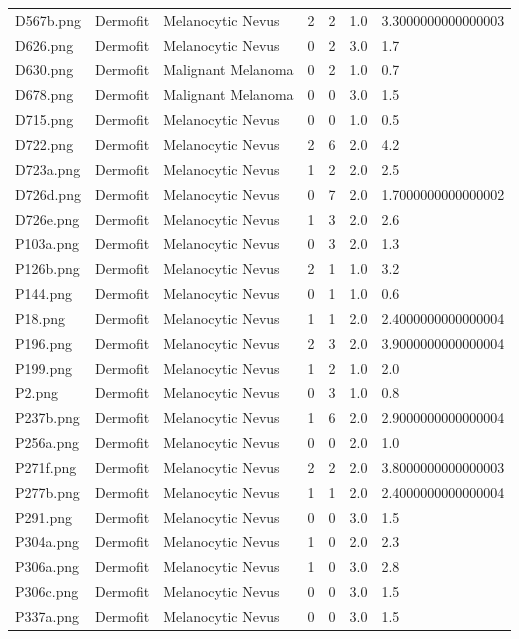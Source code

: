 \begin{longtable}{ | l | l | l | l | l | l | l |}
D567b.png & Dermofit & Melanocytic Nevus & 2 & 2 & 1.0 & 3.3000000000000003 \\
D626.png & Dermofit & Melanocytic Nevus & 0 & 2 & 3.0 & 1.7 \\
D630.png & Dermofit & Malignant Melanoma & 0 & 2 & 1.0 & 0.7 \\
D678.png & Dermofit & Malignant Melanoma & 0 & 0 & 3.0 & 1.5 \\
D715.png & Dermofit & Melanocytic Nevus & 0 & 0 & 1.0 & 0.5 \\
D722.png & Dermofit & Melanocytic Nevus & 2 & 6 & 2.0 & 4.2 \\
D723a.png & Dermofit & Melanocytic Nevus & 1 & 2 & 2.0 & 2.5 \\
D726d.png & Dermofit & Melanocytic Nevus & 0 & 7 & 2.0 & 1.7000000000000002 \\
D726e.png & Dermofit & Melanocytic Nevus & 1 & 3 & 2.0 & 2.6 \\
P103a.png & Dermofit & Melanocytic Nevus & 0 & 3 & 2.0 & 1.3 \\
P126b.png & Dermofit & Melanocytic Nevus & 2 & 1 & 1.0 & 3.2 \\
P144.png & Dermofit & Melanocytic Nevus & 0 & 1 & 1.0 & 0.6 \\
P18.png & Dermofit & Melanocytic Nevus & 1 & 1 & 2.0 & 2.4000000000000004 \\
P196.png & Dermofit & Melanocytic Nevus & 2 & 3 & 2.0 & 3.9000000000000004 \\
P199.png & Dermofit & Melanocytic Nevus & 1 & 2 & 1.0 & 2.0 \\
P2.png & Dermofit & Melanocytic Nevus & 0 & 3 & 1.0 & 0.8 \\
P237b.png & Dermofit & Melanocytic Nevus & 1 & 6 & 2.0 & 2.9000000000000004 \\
P256a.png & Dermofit & Melanocytic Nevus & 0 & 0 & 2.0 & 1.0 \\
P271f.png & Dermofit & Melanocytic Nevus & 2 & 2 & 2.0 & 3.8000000000000003 \\
P277b.png & Dermofit & Melanocytic Nevus & 1 & 1 & 2.0 & 2.4000000000000004 \\
P291.png & Dermofit & Melanocytic Nevus & 0 & 0 & 3.0 & 1.5 \\
P304a.png & Dermofit & Melanocytic Nevus & 1 & 0 & 2.0 & 2.3 \\
P306a.png & Dermofit & Melanocytic Nevus & 1 & 0 & 3.0 & 2.8 \\
P306c.png & Dermofit & Melanocytic Nevus & 0 & 0 & 3.0 & 1.5 \\
P337a.png & Dermofit & Melanocytic Nevus & 0 & 0 & 3.0 & 1.5 \\

\end{longtable}
